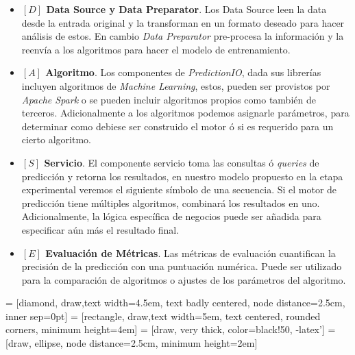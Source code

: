 \begin{itemize}

  \item\label{dase-datasource} 
  \textbf{ $[D]$ Data Source y Data Preparator}. Los Data Source leen la data desde la entrada original y la transforman en un formato deseado para hacer análisis de estos. En cambio \emph{Data Preparator} pre-procesa la información y la reenvía a los algoritmos para   hacer el modelo de entrenamiento.


  \item\label{dase-algoritmo} 
  \textbf{ $[A]$ Algoritmo}. Los componentes de \emph{PredictionIO}, dada sus librerías incluyen algoritmos de \emph{Machine Learning}, estos, pueden ser provistos por \emph{Apache Spark} o se pueden incluir algoritmos propios como también de terceros.
    Adicionalmente a los algoritmos podemos asignarle parámetros, para determinar como debiese ser construido el motor ó si es requerido para un cierto algoritmo.



  \item\label{dase-servicio} 
  \textbf{ $[S]$ Servicio}. El componente servicio toma las consultas ó \emph{queries} de predicción y retorna los resultados, en nuestro modelo propuesto en la etapa experimental veremos el siguiente símbolo de una secuencia. 
  Si el motor de predicción tiene múltiples algoritmos, combinará los resultados en uno. Adicionalmente, la lógica específica de negocios puede ser añadida para especificar aún más el resultado final. 
 
  \item\label{dase-eval} 
  \textbf{ $[E]$ Evaluación de Métricas}.
Las métricas de evaluación cuantifican la precisión de la predicción con una puntuación numérica. Puede ser utilizado para la comparación de algoritmos o ajustes de los parámetros del algoritmo.
\end{itemize}




   = [diamond, draw,text width=4.5em, text badly centered, node distance=2.5cm, inner sep=0pt]
   = [rectangle, draw,text width=5em, text centered, rounded corners, minimum height=4em]
   = [draw, very thick, color=black!50, -latex']
   = [draw, ellipse, node distance=2.5cm,
  minimum height=2em]


